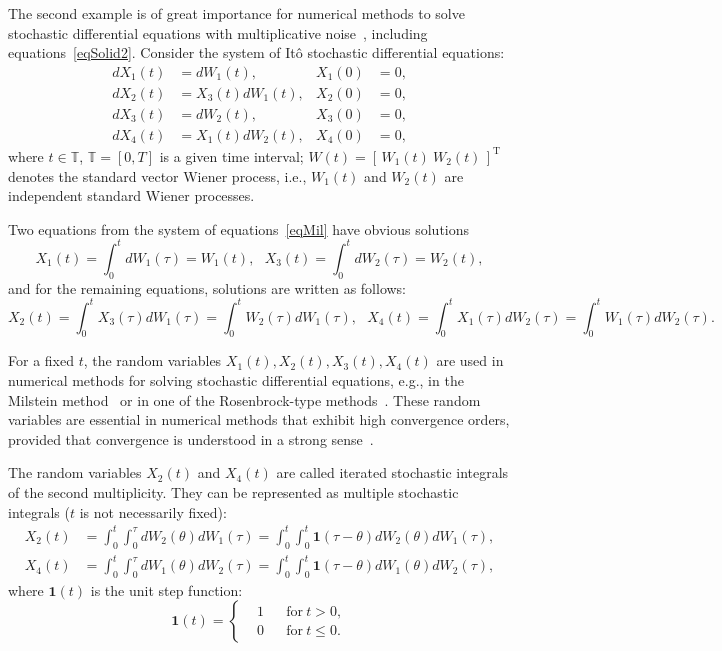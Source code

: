 \documentclass[10pt,reqno]{amsart}
\newcommand{\trans}{{\scriptscriptstyle \mathrm{T}}}
\theoremstyle{plain}
\theoremstyle{remark}
\begin{document}
The second example is of great importance for numerical methods to solve stochastic differential equations with multiplicative noise~\cite{KloPla_92, ArtAve_97, MilTre_04, Kuz_DUPU23}, including equations~\eqref{eqSolid2}. Consider the system of It\^o stochastic differential equations:
\begin{equation}\label{eqMil}
  \begin{aligned}
    dX_1(t) & = dW_1(t), & X_1(0) & = 0, \\
    dX_2(t) & = X_3(t) dW_1(t), & X_2(0) & = 0, \\
    dX_3(t) & = dW_2(t), & X_3(0) & = 0, \\
    dX_4(t) & = X_1(t) dW_2(t), & X_4(0) & = 0,
  \end{aligned}
\end{equation}
where $t \in \mathds{T}$, $\mathds{T} = [0,T]$ is a given time interval; $W(t) = [ \, W_1(t) ~ W_2(t) \, ]^\trans $ denotes the standard vector Wiener process, i.e., $W_1(t)$ and $W_2(t)$ are independent standard Wiener processes.

Two equations from the system of equations~\eqref{eqMil} have obvious solutions
\[
  X_1(t) = \int_0^t dW_1(\tau) = W_1(t), \ \ \ X_3(t) = \int_0^t dW_2(\tau) = W_2(t),
\]
and for the remaining equations, solutions are written as follows:
\[
  X_2(t) = \int_0^t X_3(\tau) dW_1(\tau) = \int_0^t W_2(\tau) dW_1(\tau), \ \ \ X_4(t) = \int_0^t X_1(\tau) dW_2(\tau) = \int_0^t W_1(\tau) dW_2(\tau).
\]

For a fixed $t$, the random variables $X_1(t),X_2(t),X_3(t),X_4(t)$ are used in numerical methods for solving stochastic differential equations, e.g., in the Milstein method~\cite{MilTre_04} or in one of the Rosenbrock-type methods~\cite{AveRyb_SJVM24}. These random variables are essential in numerical methods that exhibit high convergence orders, provided that convergence is understood in a strong sense~\cite{KloPla_92, Kuz_DUPU23, Ryb_Springer22}.

The random variables $X_2(t)$ and $X_4(t)$ are called iterated stochastic integrals of the second multiplicity. They can be represented as multiple stochastic integrals ($t$ is not necessarily fixed):
\begin{align*}
  X_2(t) & = \int_0^t \int_0^\tau {dW_2(\theta) dW_1(\tau)} = \int_0^t \int_0^t {\mathbf{1}(\tau-\theta) dW_2(\theta) dW_1(\tau)}, \\
  X_4(t) & = \int_0^t \int_0^\tau {dW_1(\theta) dW_2(\tau)} = \int_0^t \int_0^t {\mathbf{1}(\tau-\theta) dW_1(\theta) dW_2(\tau)},
\end{align*}
where $\mathbf{1}(t)$ is the unit step function:
\[
  \mathbf{1}(t) = \left\{ \begin{aligned}
    & 1 & & \text{for} ~ t > 0, \\
    & 0 & & \text{for} ~ t \leqslant 0.
  \end{aligned} \right.
\]
\end{document}
